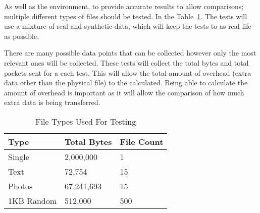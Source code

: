 As well as the environment, to provide accurate results to allow comparisons; multiple different types of files should be tested. In the Table~\ref{tab:file-types-used-for-testing}. The tests will use a mixture of real and synthetic data, which will keep the tests to as real life as possible.

There are many possible data points that can be collected however only the most relevant ones will be collected. These tests will collect the total bytes and total packets sent for a each test. This will allow the total amount of overhead (extra data other than the physical file) to the calculated. Being able to calculate the amount of overhead is important as it will allow the comparison of how much extra data is being transferred.

\begin{table}[h!]
	\caption{File Types Used For Testing}
	\label{tab:file-types-used-for-testing}
	\centering
	\begin{tabular}{ l l l }
		\hline
		\textbf{Type} & \textbf{Total Bytes} & \textbf{File Count} \\
		\hline
		Single        & 2,000,000            & 1                   \\
		\hline
		Text          & 72,754               & 15                  \\
		\hline
		Photos        & 67,241,693           & 15                  \\
		\hline
		1KB Random    & 512,000              & 500                 \\
		\hline
	\end{tabular}
\end{table}

